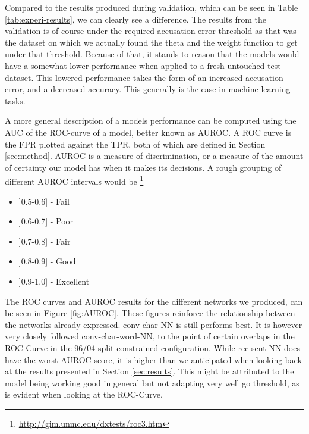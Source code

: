Compared to the results produced during validation, which can be seen in
Table \ref{tab:experi-results}, we can clearly see a difference. The results
from the validation is of course under the required accusation error threshold
as that was the dataset on which we actually found the theta and the weight
function to get under that threshold. Because of that, it stands to reason that
the models would have a somewhat lower performance when applied to a fresh
untouched test dataset. This lowered performance takes the form of an increased
accusation error, and a decreased accuracy. This generally is the case in
machine learning tasks.

A more general description of a models performance can be computed using the
\gls{AUC} of the \gls{ROC}-curve of a model, better known as \gls{AUROC}.
A \gls{ROC} curve is the \gls{FPR} plotted against the \gls{TPR}, both of
which are defined in Section \ref{sec:method}. \gls{AUROC} is a measure of
discrimination, or a measure of the amount of certainty our model has when it
makes its decisions. A rough grouping of different \gls{AUROC} intervals would
be \footnote{\url{http://gim.unmc.edu/dxtests/roc3.htm}}

\begin{itemize}
    \item ]0.5-0.6] - Fail
    \item ]0.6-0.7] - Poor
    \item ]0.7-0.8] - Fair
    \item ]0.8-0.9] - Good
    \item ]0.9-1.0] - Excellent
\end{itemize}

The ROC curves and AUROC results for the different networks we produced, can
be seen in Figure \ref{fig:AUROC}. These figures reinforce the relationship
between the networks already expressed. \gls{conv-char-NN} is still performs
best. It is however very closely followed \gls{conv-char-word-NN}, to the
point of certain overlaps in the ROC-Curve in the 96/04 split constrained
configuration. While \gls{rec-sent-NN} does have the worst AUROC score, it is
higher than we anticipated when looking back at the results presented in Section
\ref{sec:results}. This might be attributed to the model being working good in
general but not adapting very well go threshold, as is evident when looking at
the ROC-Curve.


